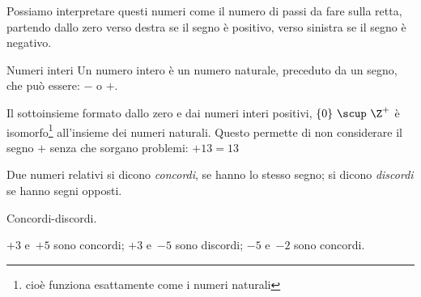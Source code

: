 {\intrappgeo}

Possiamo interpretare questi numeri come il numero di passi da fare sulla 
retta, partendo dallo zero verso destra se il segno è positivo, verso 
sinistra se il segno è negativo.


\begin{definizione}{Numeri interi}{}
Un numero intero è un numero naturale, preceduto da un segno,
che può essere: \(-\) o \(+\).
\end{definizione}

\begin{osservazione}{}{}
Il sottoinsieme formato dallo zero e dai numeri interi positivi, 
\(\{0\} ~\scup~ \Z^+\) 
è isomorfo\footnote{
cioè funziona esattamente come i numeri naturali} 
all'insieme dei numeri naturali.
Questo permette di non considerare il segno \(+\) senza che sorgano 
problemi: \(+13 = 13\)
\end{osservazione}

\begin{definizione}{}{}
Due numeri relativi si dicono \emph{concordi}, se hanno lo stesso segno; 
si dicono \emph{discordi} se hanno segni opposti.
\end{definizione}

\begin{esempio}{}{}
Concordi-discordi.

\(+3\) e~\(+5\) sono concordi; \quad 
\(+3\) e~\(-5\) sono discordi; \quad 
\(-5\) e~\(-2\) sono concordi.
\end{esempio}

